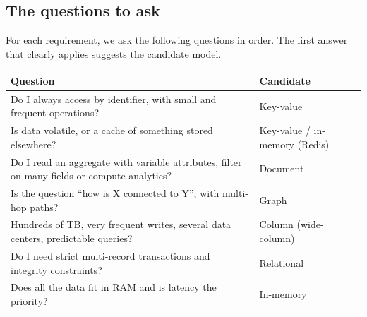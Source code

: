 \subsection{The questions to ask}
For each requirement, we ask the following questions in order. The first answer that clearly applies suggests the candidate model.

\begin{center}\small
\begin{tabular}{p{7.6cm}p{5.9cm}}
\toprule
\textbf{Question} & \textbf{Candidate} \\
\midrule
Do I always access by identifier, with small and frequent operations? & Key-value \\
Is data volatile, or a cache of something stored elsewhere? & Key-value / in-memory (Redis) \\
Do I read an aggregate with variable attributes, filter on many fields or compute analytics? & Document \\
Is the question ``how is X connected to Y'', with multi-hop paths? & Graph \\
Hundreds of TB, very frequent writes, several data centers, predictable queries? & Column (wide-column) \\
Do I need strict multi-record transactions and integrity constraints? & Relational \\
Does all the data fit in RAM and is latency the priority? & In-memory \\
\bottomrule
\end{tabular}
\end{center}

